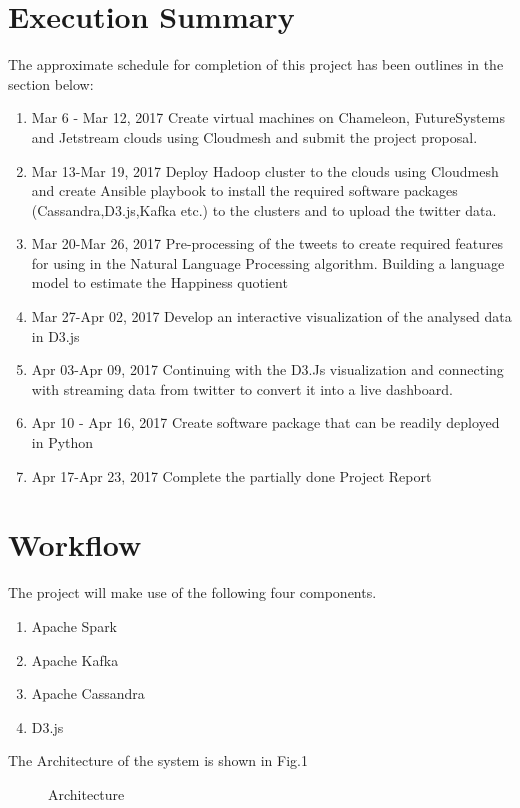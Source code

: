 \documentclass[9pt,twocolumn,twoside]{styles/osajnl}
\begin{document}
\section{Execution Summary}
The approximate schedule for completion of this project has been outlines in the section below:
\begin{enumerate}
\item {Mar 6 - Mar 12, 2017} Create virtual machines on Chameleon, FutureSystems and Jetstream clouds using Cloudmesh and submit the project proposal.
\item {Mar 13-Mar 19, 2017} Deploy Hadoop cluster to the clouds using Cloudmesh and create Ansible playbook to install the required software packages (Cassandra,D3.js,Kafka etc.) to the clusters  and to upload the twitter data.
\item {Mar 20-Mar 26, 2017} Pre-processing of the tweets to create required features for using in the Natural Language Processing algorithm. Building a language model to estimate the Happiness quotient
\item {Mar 27-Apr 02, 2017} Develop an interactive visualization of the analysed data in D3.js
\item {Apr 03-Apr 09, 2017} Continuing with the D3.Js visualization and connecting with streaming data from twitter to convert it into a live dashboard.
\item {Apr 10 - Apr 16, 2017} Create software package that can be readily deployed in Python
\item {Apr 17-Apr 23, 2017} Complete the partially done  Project Report
\end{enumerate}

\section{Workflow}
The project will make use of the following four components. 
\begin{enumerate}
    \item Apache Spark
    \item Apache Kafka
    \item Apache Cassandra
    \item D3.js
\end{enumerate}

The Architecture of the system is shown in Fig.1
\begin{figure}[htbp]
\centering
{}
\caption{Architecture}
\label{fig:false-color}
\end{figure}
\end{document}
